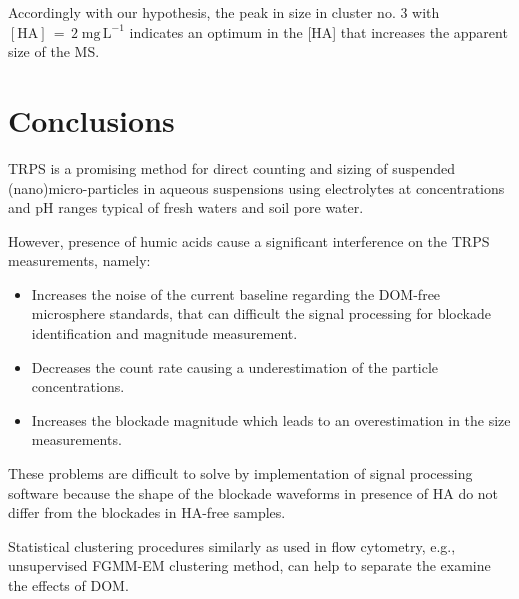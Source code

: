 \documentclass[journal=langd5,manuscript=article]{achemso}
\begin{document}
Accordingly with our hypothesis, the peak in size in cluster no. 3 with 
$\mathrm{[HA] \,=\, 2\;mg\,L^{-1}}$
indicates an optimum in the [HA] that increases the apparent size of the MS.


\section{Conclusions}

TRPS is a promising method for direct counting  and  sizing  of suspended (nano)micro-particles in aqueous suspensions using electrolytes at concentrations and pH ranges typical of fresh waters and soil pore water. 

However, presence of humic acids cause a significant interference on the TRPS measurements, namely:


\begin{itemize}
\item Increases the noise of the current baseline regarding the DOM-free microsphere standards, that can difficult the signal processing for blockade identification and magnitude measurement.

\item Decreases the count rate causing a underestimation of the particle concentrations.

\item Increases the blockade magnitude which leads to an overestimation in the size measurements.
\end{itemize}

These problems are difficult to solve by implementation of signal processing software because the shape of the blockade waveforms  in presence of HA do not differ from the blockades in HA-free samples.

Statistical clustering procedures similarly as used in flow cytometry, e.g.,  unsupervised FGMM-EM clustering method,  can help to separate the  examine the effects of DOM.
\end{document}
